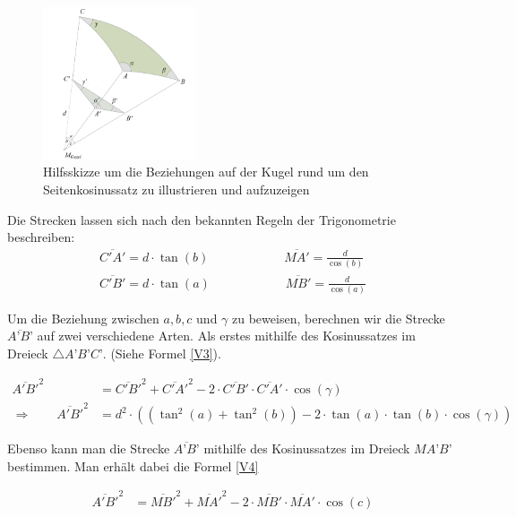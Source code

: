 \begin{refsection}
\begin{figure}[htbp]
\centering
\includegraphics[width=0.4\textwidth]{kugel/Seitenkosinus.jpg}
\caption{Hilfsskizze um die Beziehungen auf der Kugel rund um den Seitenkosinussatz zu illustrieren und aufzuzeigen}
\end{figure}

Die Strecken lassen sich nach den bekannten Regeln der Trigonometrie beschreiben:
\begin{align*}
\overline{C'A'} = d\cdot {\tan(b)} \quad \quad \quad \quad \quad \quad 
\overline{MA'} = \frac{ d }{\cos(b)} \\
\overline{C'B'} = d\cdot {\tan(a)} \quad \quad \quad \quad \quad \quad 
\overline{MB'} = \frac{ d }{\cos(a)}
\end{align*} 

Um die Beziehung zwischen $a,b,c$ und $\gamma$ zu beweisen, berechnen wir die Strecke $\overline{A’B’}$ auf zwei verschiedene Arten.
Als erstes mithilfe des Kosinussatzes im Dreieck $\triangle{A’B’C’}$. (Siehe Formel \eqref{V3}).

\begin{align}
\overline{A'B'}^{ 2 } &= \overline{ C'B' }^{ 2 } + \overline{ C'A' }^{ 2 } - 2 \cdot \overline{C'B'} \cdot \overline{ C'A' } \cdot \cos(\gamma) \nonumber \\ 
\Rightarrow \quad \quad
\overline{A'B'}^{ 2 } &= d^{ 2 } \cdot \left(\left(\tan^{ 2 }(a) + \tan^{ 2 }(b)\right) - 2\cdot \tan(a) \cdot \tan(b) \cdot \cos(\gamma)\right) 
\label {V3} 
\end{align}

Ebenso kann man die Strecke $\overline{A’B’}$ mithilfe des Kosinussatzes im Dreieck $MA’B’$ bestimmen. Man erhält dabei die Formel \eqref{V4}

\begin{align*}
\overline{A'B'}^{2} &= \overline{MB'}^{2} + \overline{MA'}^{2} - 2\cdot \overline{MB'} \cdot \overline{MA'} \cdot \cos(c)
\end{align*}


\end{refsection}
